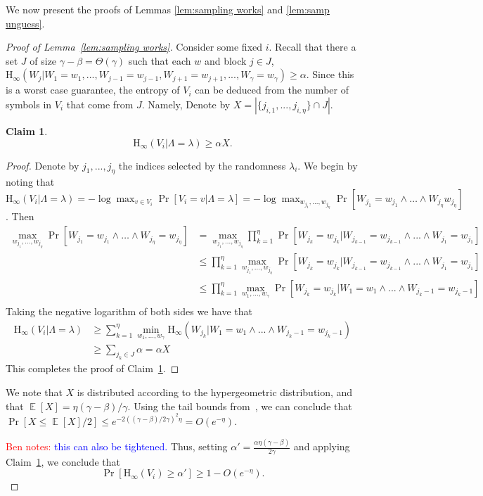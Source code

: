 \documentclass[11pt]{article}
\newcommand{\lemref}[1]{\mbox{Lemma~\ref{#1}}}
\newcommand{\clref}[1]{\mbox{Claim~\ref{#1}}}
\DeclareMathOperator*{\expe}{\mathbb{E}}
\newcommand{\Hoo}{\mathrm{H}_\infty}
\newtheorem{claim}[theorem]{Claim}
\newcommand{\authnote}[2]{{\textcolor{red}{\textsf{#1 notes: }\textcolor{blue}{ #2}}\marginpar{\textcolor{red}{\textbf{!!!!!}}}}}
\newcommand{\authnote}[2]{}
\newcommand{\bnote}[1]{{\authnote{Ben}{#1}}}
\begin{document}
\noindent
We now present the proofs of Lemmas \ref{lem:sampling works} and \ref{lem:samp unguess}.

\begin{proof}[{\large Proof of \lemref{lem:sampling works}}]
Consider some fixed $i$.
Recall that there a set $J$  of size $\gamma - \beta = \Theta(\gamma)$ such that each $w$ and  block $j\in J$, $\Hoo(W_j | W_1 = w_1,..., W_{j-1}=w_{j-1}, W_{j+1}=w_{j+1},..., W_\gamma = w_\gamma) \geq \alpha$.  Since this is a worst case guarantee, the entropy of $V_i$ can be deduced from the number of symbols in $V_i$ that come from $J$. Namely, Denote by $X= |\{j_{i, 1},..., j_{i, \eta}\}\cap J|$.

\begin{claim}
\label{cl:vi have entropy}
\[
\Hoo(V_i |\Lambda = \lambda ) \geq \alpha X.
\]
\end{claim}
\begin{proof}
Denote by $j_1,..., j_\eta$ the indices selected by the randomness $\lambda_i$.  We begin by noting that $\Hoo(V_i |\Lambda = \lambda ) = -\log \max_{v\in V_i} \Pr[ V_i =v | \Lambda =\lambda] = -\log \max_{w_{j_1}, ..., w_{j_\eta}} \Pr[W_{j_1} = w_{j_1} \wedge \dots \wedge W_{j_\eta} w_{j_\eta}] $.  Then
\begin{align*}
\max_{w_{j_1},..., w_{j_\eta}} \Pr[ W_{j_1}=w_{j_1} \wedge \dots \wedge W_{j_\eta} = w_{j_\eta}]
&= \max_{w_{j_1},..., w_{j_\eta}} \prod_{k=1}^\eta \Pr[W_{j_k} = w_{j_k} | W_{j_{k-1}} = w_{j_{k-1}} \wedge ... \wedge W_{j_1} = w_{j_1}]\\
&\le \prod_{k=1}^\eta \max_{w_{j_1},..., w_{j_\eta}} \Pr[W_{j_k} = w_{j_k} | W_{j_{k-1}} = w_{j_{k-1}} \wedge ... \wedge W_{j_1} = w_{j_1}]\\
&\le\prod_{k=1}^\eta \max_{w_1,..., w_\gamma} \Pr[W_{j_k} = w_{j_k} | W_1 = w_1 \wedge ... \wedge W_{{j_k}-1} = w_{{j_k}-1} ]\\
\end{align*}
Taking the negative logarithm of both sides we have that
\begin{align*}
\Hoo(V_i | \Lambda = \lambda) &\ge \sum_{k=1}^\eta \min_{w_1,..., w_\gamma} \Hoo(W_{j_k} | W_1 = w_1 \wedge ... \wedge W_{{j_k}-1} = w_{{j_k}-1})\\
&\ge \sum_{j_k\in J} \alpha = \alpha X
\end{align*}
This completes the proof of \clref{cl:vi have entropy}.
\end{proof}


We note that $X$ is distributed according to the hypergeometric distribution,
and that $\expe[X]=\eta(\gamma-\beta)/\gamma$. Using the tail bounds from~\cite{chvatal1979tail,scala2009hypergeometric}, we can conclude that $\Pr[X\le \expe[X]/2]\le e^{-2((\gamma-\beta)/2\gamma)^2 \eta}=O(e^{-\eta})$.

\bnote{this can also be tightened.}
Thus, setting $\alpha'=\frac{\alpha \eta(\gamma-\beta)}{2\gamma}$ and applying \clref{cl:vi have entropy}, we conclude that
 \[
\Pr[\Hoo(V_i ) \geq \alpha'] \geq 1- O(e^{-\eta}).
\]
\end{proof}
\end{document}
